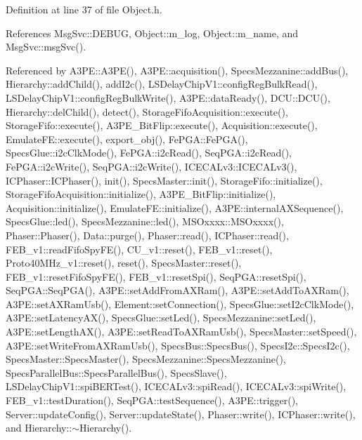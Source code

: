 Definition at line 37 of file Object.\+h.



References Msg\+Svc\+::\+D\+E\+B\+UG, Object\+::m\+\_\+log, Object\+::m\+\_\+name, and Msg\+Svc\+::msg\+Svc().



Referenced by A3\+P\+E\+::\+A3\+P\+E(), A3\+P\+E\+::acquisition(), Specs\+Mezzanine\+::add\+Bus(), Hierarchy\+::add\+Child(), add\+I2c(), L\+S\+Delay\+Chip\+V1\+::config\+Reg\+Bulk\+Read(), L\+S\+Delay\+Chip\+V1\+::config\+Reg\+Bulk\+Write(), A3\+P\+E\+::data\+Ready(), D\+C\+U\+::\+D\+C\+U(), Hierarchy\+::del\+Child(), detect(), Storage\+Fifo\+Acquisition\+::execute(), Storage\+Fifo\+::execute(), A3\+P\+E\+\_\+\+Bit\+Flip\+::execute(), Acquisition\+::execute(), Emulate\+F\+E\+::execute(), export\+\_\+obj(), Fe\+P\+G\+A\+::\+Fe\+P\+G\+A(), Specs\+Glue\+::i2c\+Clk\+Mode(), Fe\+P\+G\+A\+::i2c\+Read(), Seq\+P\+G\+A\+::i2c\+Read(), Fe\+P\+G\+A\+::i2c\+Write(), Seq\+P\+G\+A\+::i2c\+Write(), I\+C\+E\+C\+A\+Lv3\+::\+I\+C\+E\+C\+A\+Lv3(), I\+C\+Phaser\+::\+I\+C\+Phaser(), init(), Specs\+Master\+::init(), Storage\+Fifo\+::initialize(), Storage\+Fifo\+Acquisition\+::initialize(), A3\+P\+E\+\_\+\+Bit\+Flip\+::initialize(), Acquisition\+::initialize(), Emulate\+F\+E\+::initialize(), A3\+P\+E\+::internal\+A\+X\+Sequence(), Specs\+Glue\+::led(), Specs\+Mezzanine\+::led(), M\+S\+Oxxxx\+::\+M\+S\+Oxxxx(), Phaser\+::\+Phaser(), Data\+::purge(), Phaser\+::read(), I\+C\+Phaser\+::read(), F\+E\+B\+\_\+v1\+::read\+Fifo\+Spy\+F\+E(), C\+U\+\_\+v1\+::reset(), F\+E\+B\+\_\+v1\+::reset(), Proto40\+M\+Hz\+\_\+v1\+::reset(), reset(), Specs\+Master\+::reset(), F\+E\+B\+\_\+v1\+::reset\+Fifo\+Spy\+F\+E(), F\+E\+B\+\_\+v1\+::reset\+Spi(), Seq\+P\+G\+A\+::reset\+Spi(), Seq\+P\+G\+A\+::\+Seq\+P\+G\+A(), A3\+P\+E\+::set\+Add\+From\+A\+X\+Ram(), A3\+P\+E\+::set\+Add\+To\+A\+X\+Ram(), A3\+P\+E\+::set\+A\+X\+Ram\+Usb(), Element\+::set\+Connection(), Specs\+Glue\+::set\+I2c\+Clk\+Mode(), A3\+P\+E\+::set\+Latency\+A\+X(), Specs\+Glue\+::set\+Led(), Specs\+Mezzanine\+::set\+Led(), A3\+P\+E\+::set\+Length\+A\+X(), A3\+P\+E\+::set\+Read\+To\+A\+X\+Ram\+Usb(), Specs\+Master\+::set\+Speed(), A3\+P\+E\+::set\+Write\+From\+A\+X\+Ram\+Usb(), Specs\+Bus\+::\+Specs\+Bus(), Specs\+I2c\+::\+Specs\+I2c(), Specs\+Master\+::\+Specs\+Master(), Specs\+Mezzanine\+::\+Specs\+Mezzanine(), Specs\+Parallel\+Bus\+::\+Specs\+Parallel\+Bus(), Specs\+Slave(), L\+S\+Delay\+Chip\+V1\+::spi\+B\+E\+R\+Test(), I\+C\+E\+C\+A\+Lv3\+::spi\+Read(), I\+C\+E\+C\+A\+Lv3\+::spi\+Write(), F\+E\+B\+\_\+v1\+::test\+Duration(), Seq\+P\+G\+A\+::test\+Sequence(), A3\+P\+E\+::trigger(), Server\+::update\+Config(), Server\+::update\+State(), Phaser\+::write(), I\+C\+Phaser\+::write(), and Hierarchy\+::$\sim$\+Hierarchy().


